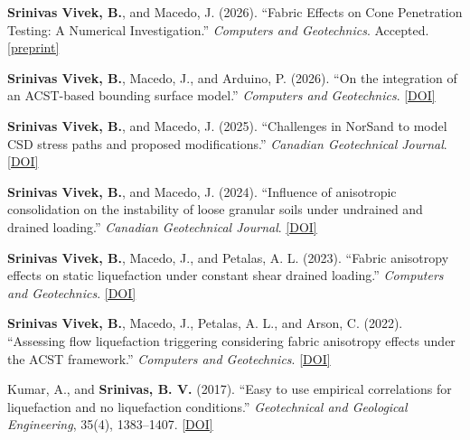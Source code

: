 \documentclass[10pt,letterpaper]{article}
\newcommand{\pub}[2]{%
    \item \hypertarget{pub:#1}{}#2
}
\begin{document}
\begin{enumerate}[label={[\arabic*]}, leftmargin=*, itemsep=0pt]

\pub{1}{\textbf{Srinivas Vivek, B.}, and Macedo, J. (2026). ``Fabric Effects on Cone Penetration Testing: A Numerical Investigation.'' \textit{Computers and Geotechnics}. Accepted. \href{https://papers.ssrn.com/sol3/papers.cfm?abstract_id=6864496}{[preprint]}}

\pub{2}{\textbf{Srinivas Vivek, B.}, Macedo, J., and Arduino, P. (2026). ``On the integration of an ACST-based bounding surface model.'' \textit{Computers and Geotechnics}. \href{https://doi.org/10.1016/j.compgeo.2026.107911}{[DOI]}}

\pub{3}{\textbf{Srinivas Vivek, B.}, and Macedo, J. (2025). ``Challenges in NorSand to model CSD stress paths and proposed modifications.'' \textit{Canadian Geotechnical Journal}. \href{https://cdnsciencepub.com/doi/pdf/10.1139/cgj-2024-0546}{[DOI]}}

\pub{4}{\textbf{Srinivas Vivek, B.}, and Macedo, J. (2024). ``Influence of anisotropic consolidation on the instability of loose granular soils under undrained and drained loading.'' \textit{Canadian Geotechnical Journal}. \href{https://cdnsciencepub.com/doi/abs/10.1139/cgj-2023-0683}{[DOI]}}

\pub{5}{\textbf{Srinivas Vivek, B.}, Macedo, J., and Petalas, A. L. (2023). ``Fabric anisotropy effects on static liquefaction under constant shear drained loading.'' \textit{Computers and Geotechnics}. \href{https://www.sciencedirect.com/science/article/pii/S0266352X23004810}{[DOI]}}

\pub{6}{\textbf{Srinivas Vivek, B.}, Macedo, J., Petalas, A. L., and Arson, C. (2022). ``Assessing flow liquefaction triggering considering fabric anisotropy effects under the ACST framework.'' \textit{Computers and Geotechnics}. \href{https://www.sciencedirect.com/science/article/pii/S0266352X22001537}{[DOI]}}

\pub{7}{Kumar, A., and \textbf{Srinivas, B. V.} (2017). ``Easy to use empirical correlations for liquefaction and no liquefaction conditions.'' \textit{Geotechnical and Geological Engineering}, 35(4), 1383--1407. \href{https://link.springer.com/content/pdf/10.1007\%2Fs10706-017-0183-2.pdf}{[DOI]}}

\end{enumerate}


\end{document}
